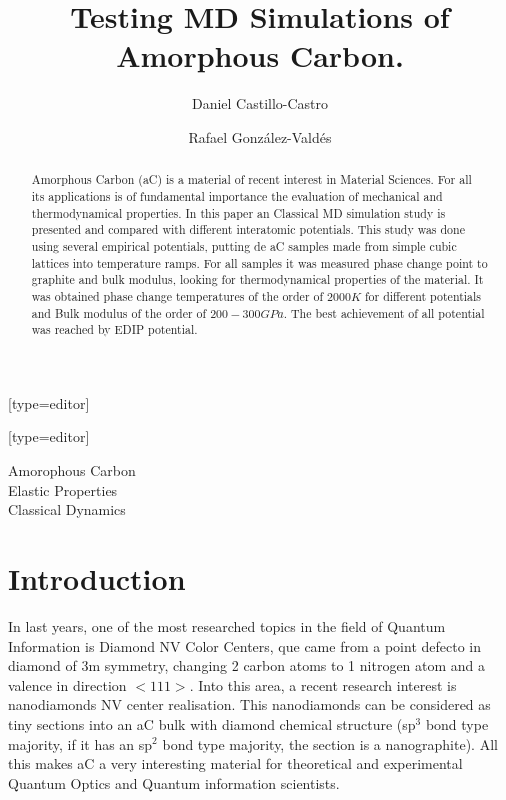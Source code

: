 \documentclass[a4paper,fleqn]{cas-dc}
\begin{document}
\title[mode = title]{Testing MD Simulations of Amorphous Carbon.}
\author[1]{Daniel Castillo-Castro}[type=editor]
\author[1]{Rafael González-Valdés}[type=editor]
\address[1]{Centro de Óptica e Información Cuántica, Universidad Mayor, Camino la Pirámide 5750, Huechuraba, Santiago de Chile.}
\begin{abstract}
Amorphous Carbon (aC) is a material of recent interest in Material Sciences. For all its applications is of fundamental importance the evaluation of mechanical and thermodynamical properties. In this paper an Classical MD simulation study is presented and compared with different interatomic potentials. This study was done using several empirical potentials, putting de aC samples made from simple cubic lattices into temperature ramps. For all samples it was measured phase change point to graphite and bulk modulus, looking for thermodynamical properties of the material. It was obtained phase change temperatures of the order of $2000 K$ for different potentials and Bulk modulus of the order of $200-300 GPa$. The best achievement of all potential was reached by EDIP potential.
\end{abstract}
\begin{highlights}
\item 
\item 
\item 
\end{highlights}
\begin{keywords}
Amorophous Carbon\\ Elastic Properties \\Classical Dynamics
\end{keywords}
\begin{graphicalabstract}
\end{graphicalabstract}
\maketitle
\section{Introduction}
In last years, one of the most researched topics in the field of Quantum Information is Diamond NV Color Centers, que came from a point defecto in diamond of 3m symmetry, changing 2 carbon atoms to 1 nitrogen atom and a valence in direction $<111>$.\cite{NVDiamond} Into this area, a recent research interest is nanodiamonds NV center realisation. This nanodiamonds can be considered as tiny sections into an aC bulk with diamond chemical structure (sp$^3$ bond type majority, if it has an sp$^2$ bond type majority, the section is a nanographite). All this makes aC a very interesting material for theoretical and experimental Quantum Optics and Quantum information scientists.
\end{document}
